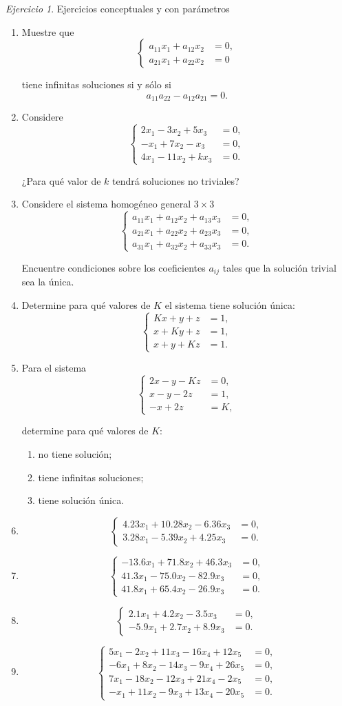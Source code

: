 \documentclass[12pt]{article}
\theoremstyle{remark}
\newtheorem{Ejer}[definicion]{Ejercicio}
\newcommand{\sistema}[1]{%
\[
\left\{
\begin{aligned}
#1
\end{aligned}
\right.
\]
}
\begin{document}
\begin{Ejer} Ejercicios conceptuales y con parámetros

\begin{enumerate}[resume]
\item Muestre que
\sistema{a_{11}x_1+a_{12}x_2&=0,\\a_{21}x_1+a_{22}x_2&=0}
tiene infinitas soluciones si y sólo si
\[
a_{11}a_{22}-a_{12}a_{21}=0.
\]

\item Considere
\sistema{
2x_1-3x_2+5x_3&=0,\\
-x_1+7x_2-x_3&=0,\\
4x_1-11x_2+kx_3&=0.
}
¿Para qué valor de $k$ tendrá soluciones no triviales?

\item Considere el sistema homogéneo general $3\times3$
\sistema{
a_{11}x_1+a_{12}x_2+a_{13}x_3&=0,\\
a_{21}x_1+a_{22}x_2+a_{23}x_3&=0,\\
a_{31}x_1+a_{32}x_2+a_{33}x_3&=0.
}
Encuentre condiciones sobre los coeficientes $a_{ij}$ tales que la solución trivial sea la única.

\item Determine para qué valores de $K$ el sistema tiene solución única:
\sistema{
Kx+y+z&=1,\\
x+Ky+z&=1,\\
x+y+Kz&=1.
}

\item Para el sistema
\sistema{
2x-y-Kz&=0,\\
x-y-2z&=1,\\
-x+2z&=K,
}
determine para qué valores de $K$:
\begin{enumerate}[label=\alph*)]
\item no tiene solución;
\item tiene infinitas soluciones;
\item tiene solución única.
\end{enumerate}

\item \sistema{
4.23x_1+10.28x_2-6.36x_3&=0,\\
3.28x_1-5.39x_2+4.25x_3&=0.
}

\item \sistema{
-13.6x_1+71.8x_2+46.3x_3&=0,\\
41.3x_1-75.0x_2-82.9x_3&=0,\\
41.8x_1+65.4x_2-26.9x_3&=0.
}

\item \sistema{
2.1x_1+4.2x_2-3.5x_3&=0,\\
-5.9x_1+2.7x_2+8.9x_3&=0.
}

\item \sistema{
5x_1-2x_2+11x_3-16x_4+12x_5&=0,\\
-6x_1+8x_2-14x_3-9x_4+26x_5&=0,\\
7x_1-18x_2-12x_3+21x_4-2x_5&=0,\\
-x_1+11x_2-9x_3+13x_4-20x_5&=0.
}
\end{enumerate}
\end{Ejer}
\end{document}
